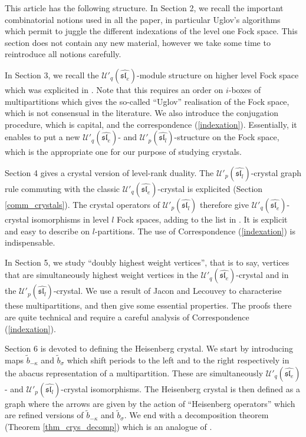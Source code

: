 \documentclass[twoside,12pt]{amsart}
\theoremstyle{plain}
\newcommand{\si}{\sigma}
\newcommand{\ka}{\kappa}
\newcommand{\tb}{\tilde{b}}
\newcommand{\Ue}{\mathcal{U}'_q (\widehat{\mathfrak{sl}_e})}
\newcommand{\Ul}{\mathcal{U}'_p (\widehat{\mathfrak{sl}_l})}
\theoremstyle{remark}
\begin{document}
This article has the following structure.
In Section 2, we recall the important combinatorial notions used in all the paper,
in particular Uglov's algorithms which permit to juggle the different indexations of
the level one Fock space.
This section does not contain any new material, however we take some time to
reintroduce all notions carefully.

In Section 3, we recall the $\Ue$-module structure on higher level Fock space
which was explicited in \cite{JMMO1991}.
Note that this requires an order on $i$-boxes of multipartitions which gives the so-called
``Uglov'' realisation of the Fock space, which is not consensual in the literature.
We also introduce the conjugation procedure, which is capital,
and the correspondence (\ref{indexation}).
Essentially, it enables to put a new $\Ue$- and $\Ul$-structure on the Fock space,
which is the appropriate one for our purpose of studying crystals.

Section 4 gives a crystal version of level-rank duality.
The $\Ul$-crystal graph rule commuting
with the classic $\Ue$-crystal is explicited (Section \ref{comm_crystals}).
The crystal operators of $\Ul$ therefore give
$\Ue$-crystal isomorphisms in level $l$ Fock spaces,
adding to the list in \cite{Gerber2015}.
It is explicit and easy to describe on $l$-partitions.
The use of Correspondence (\ref{indexation}) is indispensable.

In Section 5, we study ``doubly highest weight vertices'',
that is to say, vertices that are simultaneously highest weight vertices
in the $\Ue$-crystal and in the $\Ul$-crystal.
We use a result of Jacon and Lecouvey \cite[Theorem 5.9]{JaconLecouvey2012}
to characterise these multipartitions, and then give some
essential properties.
The proofs there are quite technical and require 
a careful analysis of Correspondence (\ref{indexation}).


Section 6 is devoted to defining the Heisenberg crystal.
We start by introducing maps $\tb_{-\ka}$ and $\tb_\si$
which shift periods to the left and to the right respectively
in the abacus representation of a multipartition.
These are simultaneously $\Ue$- and $\Ul$-crystal isomorphisms.
The Heisenberg crystal is then defined as a graph where the arrows
are given by the action of ``Heisenberg operators'' which are refined versions of
$\tb_{-\ka}$ and $\tb_\si$.
We end with a decomposition theorem (Theorem \ref{thm_crys_decomp}) which is
an analogue of \cite[Theorem 4.8]{Uglov1999}.
\end{document}
